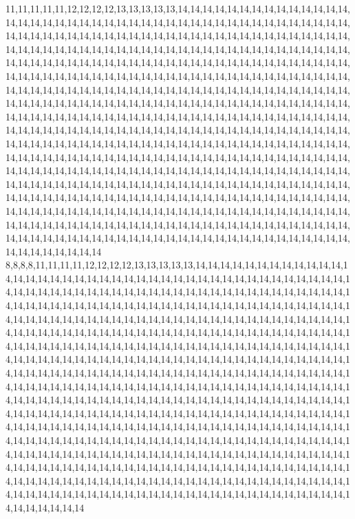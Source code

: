 11,11,11,11,11,12,12,12,12,13,13,13,13,13,14,14,14,14,14,14,14,14,14,14,14,14,14,14,14,14,14,14,14,14,14,14,14,14,14,14,14,14,14,14,14,14,14,14,14,14,14,14,14,14,14,14,14,14,14,14,14,14,14,14,14,14,14,14,14,14,14,14,14,14,14,14,14,14,14,14,14,14,14,14,14,14,14,14,14,14,14,14,14,14,14,14,14,14,14,14,14,14,14,14,14,14,14,14,14,14,14,14,14,14,14,14,14,14,14,14,14,14,14,14,14,14,14,14,14,14,14,14,14,14,14,14,14,14,14,14,14,14,14,14,14,14,14,14,14,14,14,14,14,14,14,14,14,14,14,14,14,14,14,14,14,14,14,14,14,14,14,14,14,14,14,14,14,14,14,14,14,14,14,14,14,14,14,14,14,14,14,14,14,14,14,14,14,14,14,14,14,14,14,14,14,14,14,14,14,14,14,14,14,14,14,14,14,14,14,14,14,14,14,14,14,14,14,14,14,14,14,14,14,14,14,14,14,14,14,14,14,14,14,14,14,14,14,14,14,14,14,14,14,14,14,14,14,14,14,14,14,14,14,14,14,14,14,14,14,14,14,14,14,14,14,14,14,14,14,14,14,14,14,14,14,14,14,14,14,14,14,14,14,14,14,14,14,14,14,14,14,14,14,14,14,14,14,14,14,14,14,14,14,14,14,14,14,14,14,14,14,14,14,14,14,14,14,14,14,14,14,14,14,14,14,14,14,14,14,14,14,14,14,14,14,14,14,14,14,14,14,14,14,14,14,14,14,14,14,14,14,14,14,14,14,14,14,14,14,14,14,14,14,14,14,14,14,14,14,14,14,14,14,14,14,14,14,14,14,14,14,14,14,14,14,14,14,14,14,14,14,14,14,14,14,14,14,14,14,14,14,14,14,14,14,14,14,14,14,14,14,14,14,14,14,14,14,14,14,14,14,14,14,14,14,14,14,14,14,14,14,14,14,14,14,14,14,14,14,14,14,14,14,14,14,14,14,14,14,14,14,14,14,14,14,14,14,14,14,14,14,14,14,14,14,14,14,14,14,14,14,14,14,14,14,14,14,14,14,14,14,14,14,14,14,14,14,14,14,14,14,14,14,14,14,14,14,14,14,14,14,14
8,8,8,8,11,11,11,11,12,12,12,12,13,13,13,13,13,14,14,14,14,14,14,14,14,14,14,14,14,14,14,14,14,14,14,14,14,14,14,14,14,14,14,14,14,14,14,14,14,14,14,14,14,14,14,14,14,14,14,14,14,14,14,14,14,14,14,14,14,14,14,14,14,14,14,14,14,14,14,14,14,14,14,14,14,14,14,14,14,14,14,14,14,14,14,14,14,14,14,14,14,14,14,14,14,14,14,14,14,14,14,14,14,14,14,14,14,14,14,14,14,14,14,14,14,14,14,14,14,14,14,14,14,14,14,14,14,14,14,14,14,14,14,14,14,14,14,14,14,14,14,14,14,14,14,14,14,14,14,14,14,14,14,14,14,14,14,14,14,14,14,14,14,14,14,14,14,14,14,14,14,14,14,14,14,14,14,14,14,14,14,14,14,14,14,14,14,14,14,14,14,14,14,14,14,14,14,14,14,14,14,14,14,14,14,14,14,14,14,14,14,14,14,14,14,14,14,14,14,14,14,14,14,14,14,14,14,14,14,14,14,14,14,14,14,14,14,14,14,14,14,14,14,14,14,14,14,14,14,14,14,14,14,14,14,14,14,14,14,14,14,14,14,14,14,14,14,14,14,14,14,14,14,14,14,14,14,14,14,14,14,14,14,14,14,14,14,14,14,14,14,14,14,14,14,14,14,14,14,14,14,14,14,14,14,14,14,14,14,14,14,14,14,14,14,14,14,14,14,14,14,14,14,14,14,14,14,14,14,14,14,14,14,14,14,14,14,14,14,14,14,14,14,14,14,14,14,14,14,14,14,14,14,14,14,14,14,14,14,14,14,14,14,14,14,14,14,14,14,14,14,14,14,14,14,14,14,14,14,14,14,14,14,14,14,14,14,14,14,14,14,14,14,14,14,14,14,14,14,14,14,14,14,14,14,14,14,14,14,14,14,14,14,14,14,14,14,14,14,14,14,14,14,14,14,14,14,14,14,14,14,14,14,14,14,14,14,14,14,14,14,14,14,14,14,14,14,14,14,14,14,14,14,14,14,14,14,14,14,14,14,14,14,14,14,14,14,14,14,14,14,14,14,14,14,14,14,14,14,14,14,14,14,14,14,14,14,14,14,14,14,14,14,14,14,14,14,14,14,14,14,14
